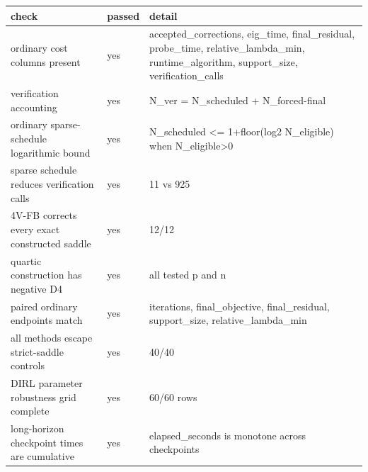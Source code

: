 \begin{tabular}{lll}
\toprule
check & passed & detail \\
\midrule
ordinary cost columns present & yes & accepted\_corrections, eig\_time, final\_residual, probe\_time, relative\_lambda\_min, runtime\_algorithm, support\_size, verification\_calls \\
verification accounting & yes & N\_ver = N\_scheduled + N\_forced-final \\
ordinary sparse-schedule logarithmic bound & yes & N\_scheduled <= 1+floor(log2 N\_eligible) when N\_eligible>0 \\
sparse schedule reduces verification calls & yes & 11 vs 925 \\
4V-FB corrects every exact constructed saddle & yes & 12/12 \\
quartic construction has negative D4 & yes & all tested p and n \\
paired ordinary endpoints match & yes & iterations, final\_objective, final\_residual, support\_size, relative\_lambda\_min \\
all methods escape strict-saddle controls & yes & 40/40 \\
DIRL parameter robustness grid complete & yes & 60/60 rows \\
long-horizon checkpoint times are cumulative & yes & elapsed\_seconds is monotone across checkpoints \\
\bottomrule
\end{tabular}
